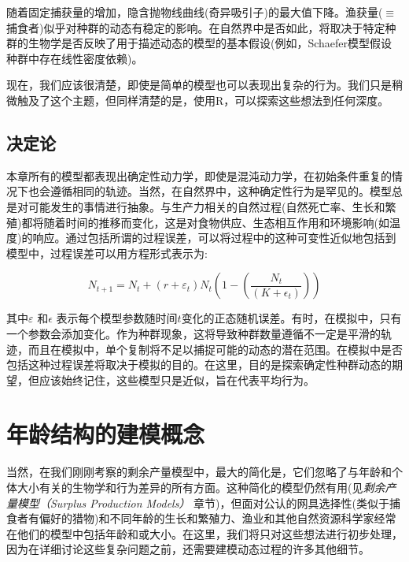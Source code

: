 \documentclass[
  lang=cn,
  11pt,
  scheme=chinese,
  chinesefont=nofont,
  citestyle=gb7714-2015,
  bibstyle=gb7714-2015]{elegantbook}
\begin{document}
随着固定捕获量的增加，隐含抛物线曲线(奇异吸引子)的最大值下降。渔获量(\(\equiv\) 捕食者)似乎对种群的动态有稳定的影响。在自然界中是否如此，将取决于特定种群的生物学是否反映了用于描述动态的模型的基本假设(例如，Schaefer模型假设种群中存在线性密度依赖)。

现在，我们应该很清楚，即使是简单的模型也可以表现出复杂的行为。我们只是稍微触及了这个主题，但同样清楚的是，使用R，可以探索这些想法到任何深度。

\subsection{决定论}\label{ux51b3ux5b9aux8bba}

本章所有的模型都表现出确定性动力学，即使是混沌动力学，在初始条件重复的情况下也会遵循相同的轨迹。当然，在自然界中，这种确定性行为是罕见的。模型总是对可能发生的事情进行抽象。与生产力相关的自然过程(自然死亡率、生长和繁殖)都将随着时间的推移而变化，这是对食物供应、生态相互作用和环境影响(如温度)的响应。通过包括所谓的过程误差，可以将过程中的这种可变性近似地包括到模型中，过程误差可以用方程形式表示为:

\begin{equation}  
{N_{t+1}}={N_t}+{({r+\varepsilon_t}){N_t}}\left( 1-{{\left( \frac{N_t}{(K+\epsilon_t)} \right)}} \right)  
\label{eq:eq32} 
\end{equation}

其中\(\varepsilon\) 和\(\epsilon\) 表示每个模型参数随时间\(t\)变化的正态随机误差。有时，在模拟中，只有一个参数会添加变化。作为种群现象，这将导致种群数量遵循不一定是平滑的轨迹，而且在模拟中，单个复制将不足以捕捉可能的动态的潜在范围。在模拟中是否包括这种过程误差将取决于模拟的目的。在这里，目的是探索确定性种群动态的期望，但应该始终记住，这些模型只是近似，旨在代表平均行为。

\section{年龄结构的建模概念}\label{ux5e74ux9f84ux7ed3ux6784ux7684ux5efaux6a21ux6982ux5ff5}

当然，在我们刚刚考察的剩余产量模型中，最大的简化是，它们忽略了与年龄和个体大小有关的生物学和行为差异的所有方面。这种简化的模型仍然有用(见\emph{剩余产量模型（Surplus Production Models）} 章节)，但面对公认的网具选择性(类似于捕食者有偏好的猎物)和不同年龄的生长和繁殖力、渔业和其他自然资源科学家经常在他们的模型中包括年龄和或大小。在这里，我们将只对这些想法进行初步处理，因为在详细讨论这些复杂问题之前，还需要建模动态过程的许多其他细节。
\end{document}
